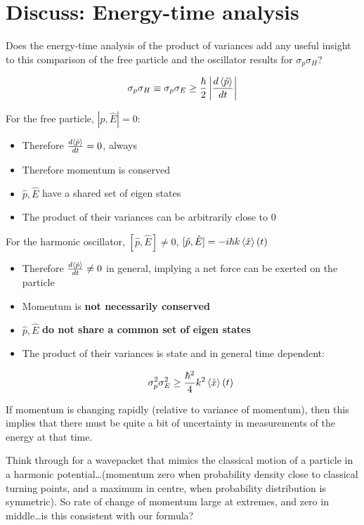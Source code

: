 \documentclass{article}
\begin{document}
\section{Discuss: Energy-time analysis}

Does the energy-time analysis of the product of variances add any useful insight to this comparison of the free particle and the oscillator results for $\sigma_p \sigma_H$?

$$\sigma_p \sigma_H \equiv \sigma_p \sigma_E \geq \frac{\hbar}{2} \left| \frac{d \braket{\hat{p}}}{dt} \right|$$

For the free particle, $|\hat{p}, \hat{E}| = 0$:

\begin{itemize}
    \item Therefore $\frac{d \braket{\hat{p}}}{dt} = 0$, always
    \item Therefore momentum is conserved
    \item $\hat{p}, \hat{E}$ have a shared set of eigen states
    \item The product of their variances can be arbitrarily close to 0
\end{itemize}

For the harmonic oscillator, $[\hat{p}, \hat{E}] \neq 0$, $[\hat{p}, \hat{E}] = -i\hbar k \braket{\hat{x}} (t)$

\begin{itemize}
    \item Therefore  $\frac{d \braket{\hat{p}}}{dt} \neq 0$ in general, implying a net force can be exerted on the particle
    \item Momentum is \textbf{not necessarily conserved}
    \item $\hat{p}, \hat{E}$ \textbf{do not share a common set of eigen states}
    \item The product of their variances is state and in general time dependent:
    
    $$\sigma_p^2 \sigma_E^2 \geq \frac{\hbar^2}{4} k^2 \braket{\hat{x}} (t)$$
\end{itemize}

If momentum is changing rapidly (relative to variance of momentum), then this implies that there must be quite a bit of uncertainty in measurements of the energy at that time.  

Think through for a wavepacket that mimics the classical motion of a particle in a harmonic potential…(momentum zero when probability density close to classical turning points, and a maximum in centre, when probability distribution is symmetric).  So rate of change of momentum large at extremes, and zero in middle…is this consistent with our formula?
\end{document}
